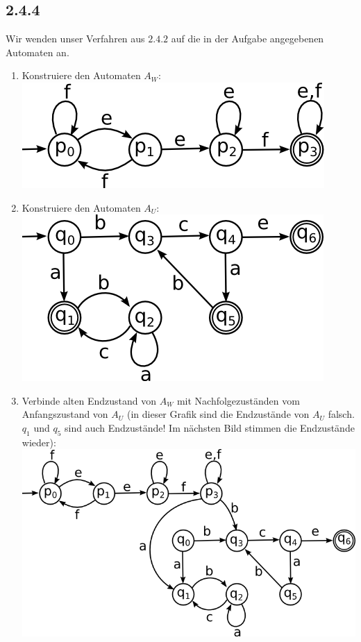 \documentclass{article}
\begin{document}
\subsection*{2.4.4}
Wir wenden unser Verfahren aus $2.4.2$ auf die in der Aufgabe angegebenen
Automaten an.
\begin{enumerate}
\item Konstruiere den Automaten $A_W$:\\
\includegraphics[width=\textwidth]{Aw.png}
\item Konstruiere den Automaten $A_U$:\\
\includegraphics[width=\textwidth]{Au.png}
\item Verbinde alten Endzustand von $A_W$ mit Nachfolgezuständen vom
Anfangszustand von $A_U$ (in dieser Grafik sind die Endzustände von $A_U$ falsch. $q_1$ und
$q_5$ sind auch Endzustände! Im nächsten Bild stimmen die Endzustände wieder):\\
\includegraphics[width=\textwidth]{AwAu1.png}

\end{enumerate}
\end{document}
